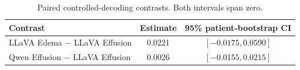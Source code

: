 \begin{table}[h]
\centering
\small
\caption{Paired controlled-decoding contrasts. Both intervals span zero.}
\begin{tabular}{lcc}
\toprule
Contrast & Estimate & 95\% patient-bootstrap CI \\
\midrule
LLaVA Edema $-$ LLaVA Effusion & 0.0221 & $[-0.0175,0.0590]$ \\
Qwen Effusion $-$ LLaVA Effusion & 0.0026 & $[-0.0155,0.0215]$ \\
\bottomrule
\end{tabular}
\end{table}

